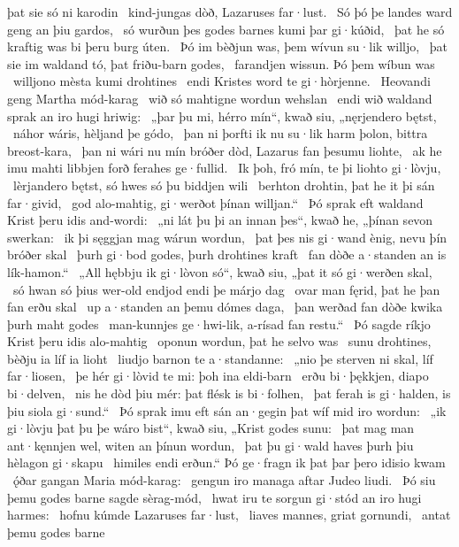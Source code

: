 þat sie só ni karodin \hld\ kind-jungas dòð,
Lazaruses far·lust. \hld\ Só þó þe landes ward
geng an þiu gardos, \hld\ só wurðun þes godes barnes
kumi þar gi·kúðid, \hld\ þat he só kraftig was
bi þeru burg úten. \hld\ Þó im bèðjun was,
þem wívun su·lik willjo, \hld\ þat sie im waldand tó,
þat friðu-barn godes, \hld\ farandjen wissun.
Þó þem wíbun was \hld\ willjono mèsta
kumi drohtines \hld\ endi Kristes word
te gi·hòrjenne. \hld\ Heovandi geng
Martha mód-karag \hld\ wið só mahtigne
wordun wehslan \hld\ endi wið waldand sprak
an iro hugi hriwig: \hld\ „þar þu mi, hérro mín“, kwað siu,
„nęrjendero bętst, \hld\ náhor wáris,
hèljand þe gódo, \hld\ þan ni þorfti ik nu su·lik harm þolon,
bittra breost-kara, \hld\ þan ni wári nu mín bróðer dòd,
Lazarus fan þesumu liohte, \hld\ ak he imu mahti libbjen forð
ferahes ge·fullid. \hld\ Ik þoh, fró mín, te þi
liohto gi·lòvju, \hld\ lèrjandero bętst,
só hwes só þu biddjen wili \hld\ berhton drohtin,
þat he it þi sán far·givid, \hld\ god alo-mahtig,
gi·werðot þínan willjan.“ \hld\ Þó sprak eft waldand Krist
þeru idis and-wordi: \hld\ „ni lát þu þi an innan þes“, kwað he,
„þínan sevon swerkan: \hld\ ik þi sęggjan mag
wárun wordun, \hld\ þat þes nis gi·wand ènig,
nevu þín bróðer skal \hld\ þurh gi·bod godes,
þurh drohtines kraft \hld\ fan dòðe a·standen
an is lík-hamon.“ \hld\ „All hębbju ik gi·lòvon só“, kwað siu,
„þat it só gi·werðen skal, \hld\ só hwan só þius wer-old endjod
endi þe márjo dag \hld\ ovar man fęrid,
þat he þan fan erðu skal \hld\ up a·standen
an þemu dómes daga, \hld\ þan werðad fan dòðe kwika
þurh maht godes \hld\ man-kunnjes ge·hwi-lik,
a-rísad fan restu.“ \hld\ Þó sagde ríkjo Krist
þeru idis alo-mahtig \hld\ oponun wordun,
þat he selvo was \hld\ sunu drohtines,
bèðju ia líf ia lioht \hld\ liudjo barnon
te a·standanne: \hld\ „nio þe sterven ni skal,
líf far·liosen, \hld\ þe hér gi·lòvid te mi:
þoh ina eldi-barn \hld\ erðu bi·þękkjen,
diapo bi·delven, \hld\ nis he dòd þiu mér:
þat flésk is bi·folhen, \hld\ þat ferah is gi·halden,
is þiu siola gi·sund.“ \hld\ Þó sprak imu eft sán an·gegin
þat wíf mid iro wordun: \hld\ „ik gi·lòvju þat þu þe wáro bist“, kwað siu,
„Krist godes sunu: \hld\ þat mag man ant·kęnnjen wel,
witen an þínun wordun, \hld\ þat þu gi·wald haves
þurh þiu hèlagon gi·skapu \hld\ himiles endi erðun.“
Þó ge·fragn ik þat þar þero idisio kwam \hld\ ǫ́ðar gangan
Maria mód-karag: \hld\ gengun iro managa aftar
Judeo liudi. \hld\ Þó siu þemu godes barne
sagde sèrag-mód, \hld\ hwat iru te sorgun gi·stód
an iro hugi harmes: \hld\ hofnu kúmde
Lazaruses far·lust, \hld\ liaves mannes,
griat gornundi, \hld\ antat þemu godes barne
